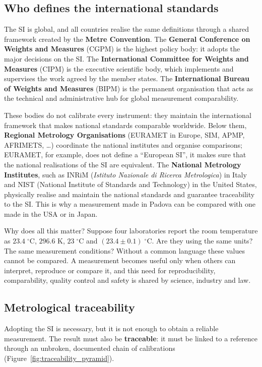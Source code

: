 \documentclass[letterpaper,11pt,leqno]{book}
\begin{document}
\subsection*{Who defines the international standards}

The SI is global, and all countries realise the same definitions through a shared framework created by the \textbf{Metre Convention}. The \textbf{General Conference on Weights and Measures} (CGPM) is the highest policy body: it adopts the major decisions on the SI. The \textbf{International Committee for Weights and Measures} (CIPM) is the executive scientific body, which implements and supervises the work agreed by the member states. The \textbf{International Bureau of Weights and Measures} (BIPM) is the permanent organisation that acts as the technical and administrative hub for global measurement comparability.

These bodies do not calibrate every instrument: they maintain the international framework that makes national standards comparable worldwide. Below them, \textbf{Regional Metrology Organisations} (EURAMET in Europe, SIM, APMP, AFRIMETS, \dots) coordinate the national institutes and organise comparisons; EURAMET, for example, does not define a ``European SI'', it makes sure that the national realisations of the SI are equivalent. The \textbf{National Metrology Institutes}, such as INRiM (\emph{Istituto Nazionale di Ricerca Metrologica}) in Italy and NIST (National Institute of Standards and Technology) in the United States, physically realise and maintain the national standards and guarantee traceability to the SI. This is why a measurement made in Padova can be compared with one made in the USA or in Japan.

Why does all this matter? Suppose four laboratories report the room temperature as $23.4\;^\circ\text{C}$, $296.6\text{ K}$, $23\;^\circ\text{C}$ and $(23.4 \pm 0.1)\;^\circ\text{C}$. Are they using the same units? The same measurement conditions? Without a common language these values cannot be compared. A measurement becomes useful only when others can interpret, reproduce or compare it, and this need for reproducibility, comparability, quality control and safety is shared by science, industry and law.

\subsection*{Metrological traceability}
\label{sec:traceability}

Adopting the SI is necessary, but it is not enough to obtain a reliable measurement. The result must also be \textbf{traceable}: it must be linked to a reference through an unbroken, documented chain of calibrations (Figure~\ref{fig:traceability_pyramid}).
\end{document}
